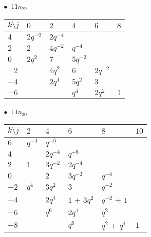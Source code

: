 %
\begin{minipage}{\linewidth}
$\bullet\ $ $11n_{29}$ \vspace{0.5em} \\
\begin{tabular}{l|lllll}
$k \setminus j$ & $0$ & $2$ & $4$ & $6$ & $8$ \\
\hline
$4$ & $2q^{-2}$ & $2q^{-4}$ &  &  &  \\
$2$ & $2$ & $4q^{-2}$ & $q^{-4}$ &  &  \\
$0$ & $2q^{2}$ & $7$ & $5q^{-2}$ &  &  \\
$-2$ &  & $4q^{2}$ & $6$ & $2q^{-2}$ &  \\
$-4$ &  & $2q^{4}$ & $5q^{2}$ & $3$ &  \\
$-6$ &  &  & $q^{4}$ & $2q^{2}$ & $1$ \\
\end{tabular}
\vspace{2em}
\end{minipage}
%
\begin{minipage}{\linewidth}
$\bullet\ $ $11n_{30}$ \vspace{0.5em} \\
\begin{tabular}{l|lllll}
$k \setminus j$ & $2$ & $4$ & $6$ & $8$ & $10$ \\
\hline
$6$ & $q^{-4}$ & $q^{-6}$ &  &  &  \\
$4$ &  & $2q^{-4}$ & $q^{-6}$ &  &  \\
$2$ & $1$ & $3q^{-2}$ & $2q^{-4}$ &  &  \\
$0$ &  & $2$ & $3q^{-2}$ & $q^{-4}$ &  \\
$-2$ & $q^{4}$ & $3q^{2}$ & $3$ & $q^{-2}$ &  \\
$-4$ &  & $2q^{4}$ & $1$ + $3q^{2}$ & $q^{-2}$ + $1$ &  \\
$-6$ &  & $q^{6}$ & $2q^{4}$ & $q^{2}$ &  \\
$-8$ &  &  & $q^{6}$ & $q^{2}$ + $q^{4}$ & $1$ \\
\end{tabular}
\vspace{2em}
\end{minipage}
%
